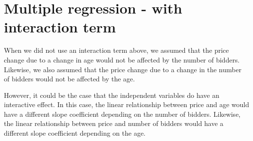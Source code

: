 \documentclass{article}\usepackage[]{graphicx}\usepackage[]{color}
\begin{document}
\newpage

\section{Multiple regression - with interaction term}

When we did not use an interaction term above, we assumed that the price change due to a change in age would not be affected by the number of bidders. Likewise, we also assumed that the price change due to a change in the number of bidders would not be affected by the age.

\vspace{5mm}


\vspace{5mm}

\noindent However, it could be the case that the independent variables do have an interactive effect. In this case, the linear relationship between price and age would have a different slope coefficient depending on the number of bidders. Likewise, the linear relationship between price and number of bidders would have a different slope coefficient depending on the age.

\vspace{5mm}

\end{document}
